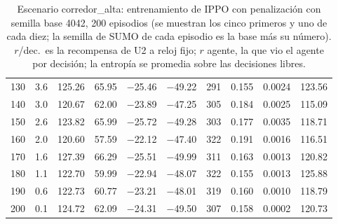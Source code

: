 \begin{table}[H]
\begin{tabular}{rrrrrrrrrr}
130 & 3.6 & 125.26 & 65.95 & $-$25.46 & $-$49.22 & 291 & 0.155 & 0.0024 & 123.56 \\
140 & 3.0 & 120.67 & 62.00 & $-$23.89 & $-$47.25 & 305 & 0.184 & 0.0025 & 115.09 \\
150 & 2.6 & 123.82 & 65.99 & $-$25.72 & $-$49.28 & 303 & 0.177 & 0.0035 & 118.71 \\
160 & 2.0 & 120.60 & 57.59 & $-$22.12 & $-$47.40 & 322 & 0.191 & 0.0016 & 116.51 \\
170 & 1.6 & 127.39 & 66.29 & $-$25.51 & $-$49.99 & 311 & 0.163 & 0.0013 & 120.82 \\
180 & 1.1 & 122.70 & 59.99 & $-$22.94 & $-$48.07 & 322 & 0.155 & 0.0013 & 125.88 \\
190 & 0.6 & 122.73 & 60.77 & $-$23.21 & $-$48.01 & 319 & 0.160 & 0.0010 & 118.79 \\
200 & 0.1 & 124.72 & 62.09 & $-$24.31 & $-$49.50 & 307 & 0.158 & 0.0002 & 120.73 \\
\bottomrule
\end{tabular}
\caption[Escenario corredor\_alta: entrenamiento de IPPO con penalización, semilla base 4042]{Escenario corredor\_alta: entrenamiento de IPPO con penalización con semilla base 4042, 200 episodios (se muestran los cinco primeros y uno de cada diez; la semilla de SUMO de cada episodio es la base más su número). $r$/dec.\ es la recompensa de U2 a reloj fijo; $r$ agente, la que vio el agente por decisión; la entropía se promedia sobre las decisiones libres.}
\label{tab:corredor_alta-ippo-spill-4042}
\end{table}


